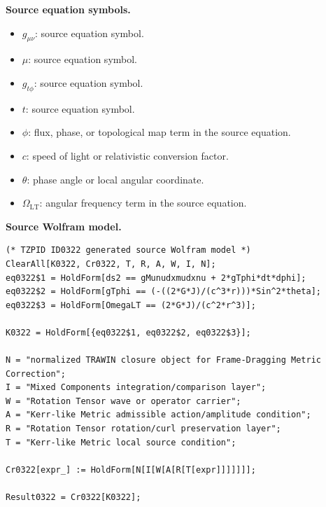 \begin{minipage}[t]{0.49\linewidth}
\begingroup
\small
\raggedright
\textbf{Source equation symbols.}\par
\begin{itemize}[leftmargin=1.35em,itemsep=1pt,topsep=1pt,parsep=0pt]
    \item $g_{\mu\nu}$: source equation symbol.
    \item $\mu$: source equation symbol.
    \item $g_{t\phi}$: source equation symbol.
    \item $t$: source equation symbol.
    \item $\phi$: flux, phase, or topological map term in the source equation.
    \item $c$: speed of light or relativistic conversion factor.
    \item $\theta$: phase angle or local angular coordinate.
    \item $\Omega_{\mathrm{LT}}$: angular frequency term in the source equation.
\end{itemize}
\endgroup
\end{minipage}\hfill
\begin{minipage}[t]{0.47\linewidth}
\begingroup
\scriptsize
\raggedright
\textbf{Source Wolfram model.}\par
\begin{Verbatim}[fontsize=\tiny,breaklines=true,breakanywhere=true]
(* TZPID ID0322 generated source Wolfram model *)
ClearAll[K0322, Cr0322, T, R, A, W, I, N];
eq0322$1 = HoldForm[ds2 == gMunudxmudxnu + 2*gTphi*dt*dphi];
eq0322$2 = HoldForm[gTphi == (-((2*G*J)/(c^3*r)))*Sin^2*theta];
eq0322$3 = HoldForm[OmegaLT == (2*G*J)/(c^2*r^3)];

K0322 = HoldForm[{eq0322$1, eq0322$2, eq0322$3}];

N = "normalized TRAWIN closure object for Frame-Dragging Metric Correction";
I = "Mixed Components integration/comparison layer";
W = "Rotation Tensor wave or operator carrier";
A = "Kerr-like Metric admissible action/amplitude condition";
R = "Rotation Tensor rotation/curl preservation layer";
T = "Kerr-like Metric local source condition";

Cr0322[expr_] := HoldForm[N[I[W[A[R[T[expr]]]]]]];

Result0322 = Cr0322[K0322];
\end{Verbatim}
\endgroup
\end{minipage}

